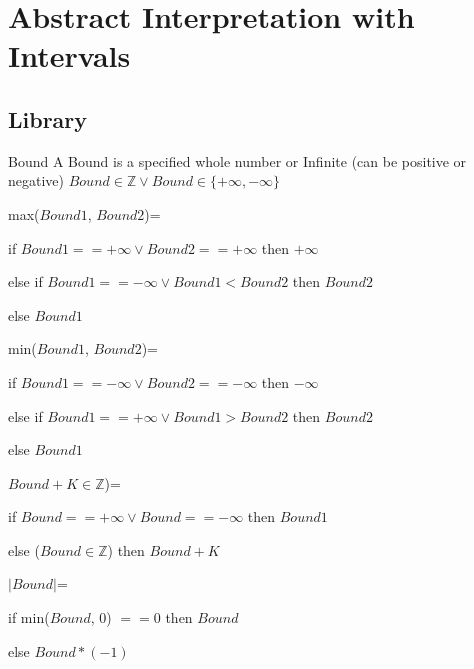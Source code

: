 
\chapter{Abstract Interpretation with Intervals}
\label{sec:intervalabstraction}

\section{Library}

\begin{definition}{Bound}
	A Bound is a specified whole number or Infinite (can be positive or negative) $Bound \in \mathbb{Z} \lor Bound \in \{ +\infty, -\infty \}$
\end{definition}

\begin{definition}{max($Bound1$, $Bound2$)=}

	if $Bound1 == +\infty \lor Bound2 == +\infty$ then $+\infty$
	
	else if $Bound1 == -\infty \lor Bound1<Bound2$ then $Bound2$
	
	else $Bound1$	
\end{definition}

\begin{definition}{min($Bound1$, $Bound2$)=}

if $Bound1 == -\infty \lor Bound2 == -\infty$ then $-\infty$

else if $Bound1 == +\infty \lor Bound1>Bound2$ then $Bound2$

else $Bound1$	
\end{definition}

\begin{definition}{$Bound+K \in \mathbb{Z}$)=}
	
	if $Bound == +\infty \lor Bound == -\infty$ then $Bound1$
	
	else ($Bound \in \mathbb{Z}$) then $Bound+K$
\end{definition}

\begin{definition}{$|Bound|$=}
	
	if min($Bound$, $0$) $==0$ then $Bound$
	
	else $Bound*(-1)$
\end{definition}
	
